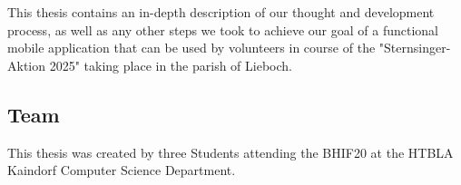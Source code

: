 \blankLine

This thesis contains an in-depth description of our thought and development
process, as well as any other steps we took to achieve our goal of a
functional mobile application that can be used by volunteers in course of the
"Sternsinger-Aktion 2025" taking place in the parish of Lieboch.

\newpage

\subsection{Team}


This thesis was created by three Students attending the BHIF20 at the
HTBLA Kaindorf Computer Science Department.\newline


